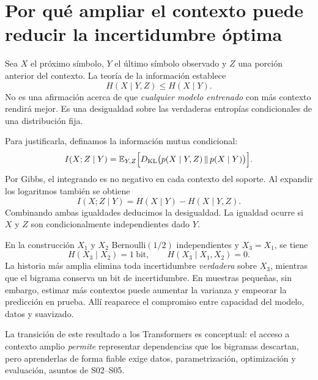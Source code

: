 \section*{Por qué ampliar el contexto puede reducir la incertidumbre óptima}
Sea $X$ el próximo símbolo, $Y$ el último símbolo observado y $Z$
una porción anterior del contexto. La teoría de la información
establece
\[
H(X\mid Y,Z)\le H(X\mid Y).
\]
No es una afirmación acerca de que \emph{cualquier modelo entrenado}
con más contexto rendirá mejor. Es una desigualdad sobre las verdaderas
entropías condicionales de una distribución fija.

Para justificarla, definamos la información mutua condicional:
\[
I(X;Z\mid Y)
=\mathbb E_{Y,Z}\Bigl[D_{\rm KL}\bigl(
 p(X\mid Y,Z)\,\|\,p(X\mid Y)
\bigr)\Bigr].
\]
Por Gibbs, el integrando es no negativo en cada contexto del soporte.
Al expandir los logaritmos también se obtiene
\[
I(X;Z\mid Y)=H(X\mid Y)-H(X\mid Y,Z).
\]
Combinando ambas igualdades deducimos la desigualdad.
La igualdad ocurre si $X$ y $Z$ son condicionalmente independientes dado $Y$.

\begin{ejemplo}
En la construcción $X_1$ y $X_2$ Bernoulli$(1/2)$ independientes y
$X_3=X_1$, se tiene
\[
H(X_3\mid X_2)=1\ \text{bit},
\qquad H(X_3\mid X_1,X_2)=0.
\]
La historia más amplia elimina toda incertidumbre \emph{verdadera}
sobre $X_3$, mientras que el bigrama conserva un bit de incertidumbre.
En muestras pequeñas, sin embargo, estimar más contextos puede aumentar
la varianza y empeorar la predicción en prueba. Allí reaparece el
compromiso entre capacidad del modelo, datos y suavizado.
\end{ejemplo}
La transición de este resultado a los Transformers es conceptual:
el acceso a contexto amplio \emph{permite} representar dependencias
que los bigramas descartan, pero aprenderlas de forma fiable exige
datos, parametrización, optimización y evaluación, asuntos de S02--S05.
